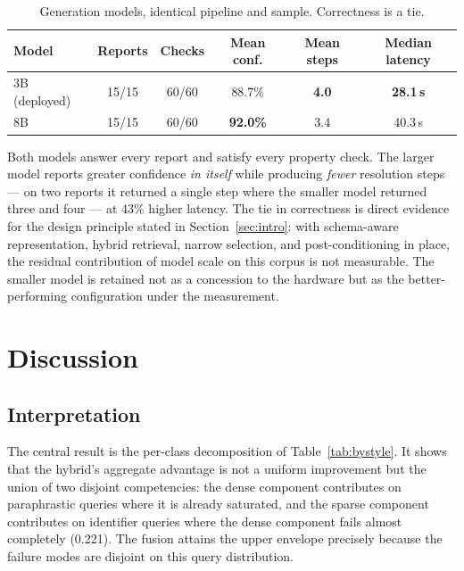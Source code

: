 \documentclass[12pt, a4paper]{article}
\begin{document}
\begin{table}[H]
\centering
\caption{Generation models, identical pipeline and sample. Correctness is a tie.}
\label{tab:models}
\begin{tabular}{lccccc}
\toprule
\textbf{Model} & \textbf{Reports} & \textbf{Checks} & \textbf{Mean conf.} & \textbf{Mean steps} & \textbf{Median latency} \\
\midrule
3B (deployed) & 15/15 & 60/60 & 88.7\% & \textbf{4.0} & \textbf{28.1\,s} \\
8B & 15/15 & 60/60 & \textbf{92.0\%} & 3.4 & 40.3\,s \\
\bottomrule
\end{tabular}
\end{table}

Both models answer every report and satisfy every property check. The larger model reports greater confidence \emph{in itself} while producing \emph{fewer} resolution steps --- on two reports it returned a single step where the smaller model returned three and four --- at 43\% higher latency. The tie in correctness is direct evidence for the design principle stated in Section~\ref{sec:intro}: with schema-aware representation, hybrid retrieval, narrow selection, and post-conditioning in place, the residual contribution of model scale on this corpus is not measurable. The smaller model is retained not as a concession to the hardware but as the better-performing configuration under the measurement.

\section{Discussion}
\label{sec:discussion}

\subsection{Interpretation}

The central result is the per-class decomposition of Table~\ref{tab:bystyle}. It shows that the hybrid's aggregate advantage is not a uniform improvement but the union of two disjoint competencies: the dense component contributes on paraphrastic queries where it is already saturated, and the sparse component contributes on identifier queries where the dense component fails almost completely (0.221). The fusion attains the upper envelope precisely because the failure modes are disjoint on this query distribution.
\end{document}

